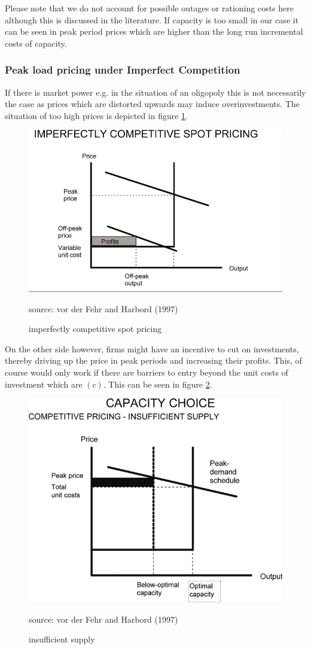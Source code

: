 Please note that we do not account for possible outages or rationing costs here although this is discussed in the literature. If capacity is too small in our case it can be seen in peak period prices which are higher than the long run incremental costs of capacity.

\subsubsection{Peak load pricing under Imperfect Competition}

If there is market power e.g. in the situation of an oligopoly this is not necessarily the case as prices which are distorted upwards may induce overinvestments. The situation of too high prices is depicted in figure \ref{peak_load_toohigh}. 

\begin{figure}[h]
\centering
\includegraphics[width=.5\textwidth]{capacity/peak_load_toohigh}
      \label{peak_load_toohigh}            
      \caption{imperfectly competitive spot pricing}
       source: vor der Fehr and Harbord (1997)
\end{figure}

On the other side however, firms might have an incentive to cut on investments, thereby driving up the price in peak periods and increasing their profits. This, of course would only work if there are barriers to entry beyond the unit costs of investment which are $(c)$. This can be seen in figure \ref{peak_load_insufficient}.

\begin{figure}[h]
\centering
\includegraphics[width=.5\textwidth]{capacity/peak_load_insufficient}
      \label{peak_load_insufficient}            
      \caption{insufficient supply}
       source: vor der Fehr and Harbord (1997)
\end{figure}

